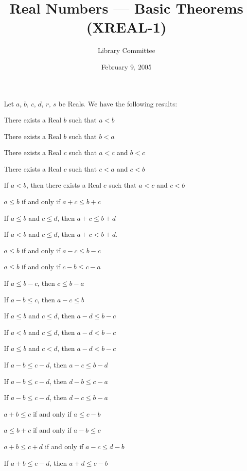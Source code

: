 \documentclass{article}
\title{Real Numbers --- Basic Theorems (XREAL-1)}
\author{Library Committee}
\date{February 9, 2005}
\let\xrbreak\medbreak
\begin{document}
\maketitle

Let $a$, $b$, $c$, $d$, $r$, $s$ be Reals. We have the following results:
\begin{thm}
\item\label{xreal1:1} There exists a Real $b$ such that $a<b$
\item\label{xreal1:2} There exists a Real $b$ such that $b<a$
\item\label{xreal1:3} There exists a Real $c$ such that $a<c$ and $b<c$
\item\label{xreal1:4} There exists a Real $c$ such that $c<a$ and $c<b$
\item\label{xreal1:5} If $a<b$, then there exists a Real $c$ such that
  $a<c$ and $c<b$
  \xrbreak
\item\label{xreal1:6} $a\leq b$ if and only if $a+c\leq b+c$
\item\label{xreal1:7} If $a\leq b$ and $c\leq d$, then $a+c\leq b+d$
\item\label{xreal1:8} If $a<b$ and $c\leq d$, then $a+c<b+d$.
  \xrbreak
\item\label{xreal1:9} $a\leq b$ if and only if $a-c\leq b-c$
\item\label{xreal1:10} $a\leq b$ if and only if $c-b\leq c-a$
\item\label{xreal1:11} If $a\leq b-c$, then $c\leq b-a$
\item\label{xreal1:12} If $a-b\leq c$, then $a-c\leq b$
\item\label{xreal1:13} If $a\leq b$ and $c\leq d$, then $a-d\leq b-c$
\item\label{xreal1:14} If $a<b$ and $c\leq d$, then $a-d<b-c$
\item\label{xreal1:15} If $a\leq b$ and $c<d$, then $a-d<b-c$
\item\label{xreal1:16} If $a-b\leq c-d$, then $a-c\leq b-d$
\item\label{xreal1:17} If $a-b\leq c-d$, then $d-b\leq c-a$
\item\label{xreal1:18} If $a-b\leq c-d$, then $d-c\leq b-a$
  \xrbreak
\item\label{xreal1:19} $a+b\leq c$ if and only if $a\leq c-b$
\item\label{xreal1:20} $a\leq b+c$ if and only if $a-b\leq c$
\item\label{xreal1:21} $a+b\leq c+d$ if and only if $a-c\leq d-b$
\item\label{xreal1:22} If $a+b\leq c-d$, then $a+d\leq c-b$

\end{thm}
\end{document}
